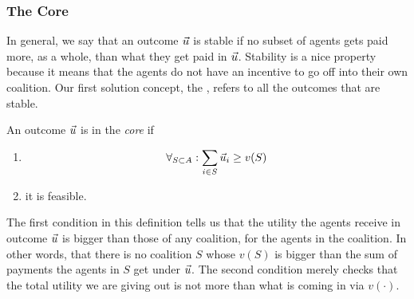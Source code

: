 \subsubsection{The Core}


In general, we say that an outcome $\vec{u}$ is stable if no subset of
agents gets paid more, as a whole, than what they get paid in $\vec{u}$.
Stability is a nice property because it means that the agents do not
have an incentive to go off into their own coalition. Our first
solution concept, the , refers to all the outcomes that are
stable.

\begin{definition}[Core]
  \label{def:core}
  An outcome $\vec{u}$ is in the \emph{core} if
  \begin{enumerate}
  \item     \[\forall_{S \subset A}: \sum_{i \in S} \vec{u}_i \geq v(S)\]
  \item it is feasible.
  \end{enumerate}
\end{definition}
The first condition in this definition tells us that the utility the
agents receive in outcome $\vec{u}$ is bigger than those of any coalition,
for the agents in the coalition. In other words, that there is no
coalition $S$ whose $v(S)$ is bigger than the sum of payments the
agents in $S$ get under $\vec{u}$. The second condition merely checks that
the total utility we are giving out is not more than what is coming in
via $v(\cdot)$.

